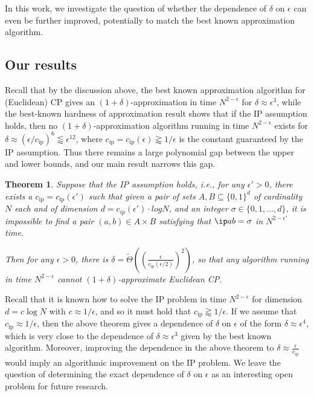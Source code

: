 \documentclass[11pt]{article}
\theoremstyle{plain}
\newtheorem{thm}{Theorem}[section]
\theoremstyle{remark}
\newcommand{\iP}{\mathrm{ip}}
\begin{document}
In this work, we investigate the question of whether the dependence of $\delta$ on $\epsilon$ can even be further improved, potentially to match the best known approximation algorithm.

\subsection{Our results}

Recall that by the discussion above, the best known approximation algorithm for (Euclidean) CP gives an $(1+\delta)$-approximation in time $N^{2-\epsilon}$ for $\delta \approx \epsilon^3$, while the best-known hardness of approximation result shows that if the IP assumption holds, then no $(1+\delta)$-approximation algorithm running in time $N^{2-\epsilon}$ exists for
$\delta \approx  (\epsilon/c_{\iP})^6 \lessapprox \epsilon^{12}$, where $c_{\iP} = c_{\iP}(\epsilon) \gtrapprox 1/\epsilon$  is the constant guaranteed by the IP assumption.
Thus there remains a large polynomial gap between the upper and lower bounds, and our main result narrows this gap.

\begin{thm}\label{thm:main}
Suppose that the IP assumption holds, i.e.,  for any $\epsilon'>0$, there exists a $c_{\iP}= c_{\iP}(\epsilon')$ such that given a pair of sets $A,B\subseteq\{0,1\}^{d}$ of cardinality $N$ each and of dimension $d = c_{ip}(\epsilon') \cdot logN$, and an integer $\sigma \in \{0,1,\ldots,d\}$,  it is impossible to find a pair $(a,b)\in A\times B$
satisfying that $\ip a b=\sigma$ in $N^{2-\epsilon'}$ time. 

Then for any $\epsilon>0$, there is  $\delta = \tilde \Theta(  ( \frac \epsilon {c_{\iP}(\epsilon/2)})^2)$,  so that any algorithm running in time 
$N^{2-\epsilon}$ cannot 
$(1+\delta)$-approximate Euclidean CP.
\end{thm}


Recall that it is known how to solve the IP problem in time $N^{2-\epsilon}$ for dimension $d = c \log N$ with 
$c\approx 1/\epsilon$, and so it must hold that $c_{\iP}  \gtrapprox 1/\epsilon$. If we assume that $c_{\iP} \approx 1/\epsilon$, then the above theorem gives a dependence of $\delta$ on $\epsilon$ of the form $\delta \approx \epsilon^4 $, which is very close to the dependence of $\delta \approx \epsilon^3$ given by the best known algorithm. Moreover, improving the dependence in the above theorem to $\delta \approx \frac \epsilon {c_{\iP}}$ would imply an algorithmic improvement on the IP problem. We leave the question of determining the exact dependence of $\delta$ on $\epsilon$ as an interesting open problem for future research.
\end{document}
